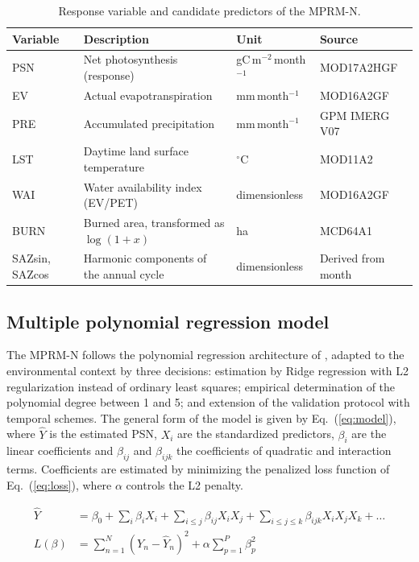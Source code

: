 \documentclass[a4paper,fleqn]{cas-sc}
\begin{document}
\begin{table}[htbp]
\caption{Response variable and candidate predictors of the MPRM-N.}\label{tbl:vars}
\begin{tabular*}{\tblwidth}{@{}LLLL@{}}
\toprule
Variable & Description & Unit & Source \\
\midrule
PSN & Net photosynthesis (response) & gC\,m$^{-2}$\,month$^{-1}$ & MOD17A2HGF \\
EV & Actual evapotranspiration & mm\,month$^{-1}$ & MOD16A2GF \\
PRE & Accumulated precipitation & mm\,month$^{-1}$ & GPM IMERG V07 \\
LST & Daytime land surface temperature & $^\circ$C & MOD11A2 \\
WAI & Water availability index (EV/PET) & dimensionless & MOD16A2GF \\
BURN & Burned area, transformed as $\log(1+x)$ & ha & MCD64A1 \\
SAZsin, SAZcos & Harmonic components of the annual cycle & dimensionless & Derived from month \\
\bottomrule
\end{tabular*}
\end{table}

\subsection{Multiple polynomial regression model}

The MPRM-N follows the polynomial regression architecture of \citet{guimaraes2024}, adapted to the environmental context by three decisions: estimation by Ridge regression with L2 regularization instead of ordinary least squares; empirical determination of the polynomial degree between 1 and 5; and extension of the validation protocol with temporal schemes. The general form of the model is given by Eq.~(\ref{eq:model}), where $\hat{Y}$ is the estimated PSN, $X_i$ are the standardized predictors, $\beta_i$ are the linear coefficients and $\beta_{ij}$ and $\beta_{ijk}$ the coefficients of quadratic and interaction terms. Coefficients are estimated by minimizing the penalized loss function of Eq.~(\ref{eq:loss}), where $\alpha$ controls the L2 penalty.
\noindent\begin{minipage}{\columnwidth}
\begin{align}
\hat{Y} &= \beta_0 + \sum_i \beta_i X_i + \sum_{i \le j} \beta_{ij} X_i X_j + \sum_{i \le j \le k} \beta_{ijk} X_i X_j X_k + \dots \label{eq:model}\\
L(\beta) &= \sum_{n=1}^{N} \left(Y_n - \hat{Y}_n\right)^2 + \alpha \sum_{p=1}^{P} \beta_p^2 \label{eq:loss}
\end{align}
\end{minipage}
\vspace{0.5\baselineskip}
\end{document}
